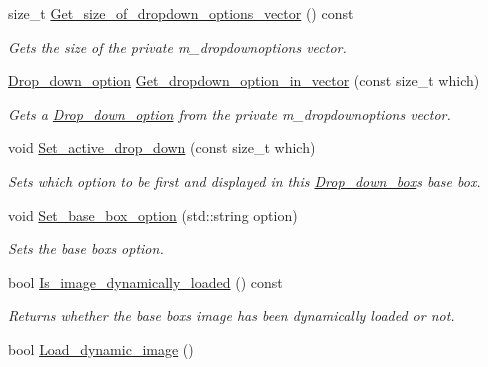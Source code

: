 \begin{DoxyCompactItemize}
size\+\_\+t \hyperlink{classjetfuel_1_1gui_1_1Drop__down__box_a72f957e19c3ce5f3da61ef3d47d09b2f}{Get\+\_\+size\+\_\+of\+\_\+dropdown\+\_\+options\+\_\+vector} () const
\begin{DoxyCompactList}\small\item\em Gets the size of the private m\+\_\+dropdownoptions vector. \end{DoxyCompactList}\item 
\hyperlink{structjetfuel_1_1gui_1_1Drop__down__box_1_1Drop__down__option}{Drop\+\_\+down\+\_\+option} \hyperlink{classjetfuel_1_1gui_1_1Drop__down__box_af6ac565eb238a27b8c988143c82cafe4}{Get\+\_\+dropdown\+\_\+option\+\_\+in\+\_\+vector} (const size\+\_\+t which)
\begin{DoxyCompactList}\small\item\em Gets a \hyperlink{structjetfuel_1_1gui_1_1Drop__down__box_1_1Drop__down__option}{Drop\+\_\+down\+\_\+option} from the private m\+\_\+dropdownoptions vector. \end{DoxyCompactList}\item 
void \hyperlink{classjetfuel_1_1gui_1_1Drop__down__box_af9d4d77418cc67a85dc98519224458f4}{Set\+\_\+active\+\_\+drop\+\_\+down} (const size\+\_\+t which)
\begin{DoxyCompactList}\small\item\em Sets which option to be first and displayed in this \hyperlink{classjetfuel_1_1gui_1_1Drop__down__box}{Drop\+\_\+down\+\_\+box}\textquotesingle{}s base box. \end{DoxyCompactList}\item 
void \hyperlink{classjetfuel_1_1gui_1_1Drop__down__box_a2fac141eb75af5c59b208753634f2e75}{Set\+\_\+base\+\_\+box\+\_\+option} (std\+::string option)
\begin{DoxyCompactList}\small\item\em Sets the base box\textquotesingle{}s option. \end{DoxyCompactList}\item 
bool \hyperlink{classjetfuel_1_1gui_1_1Drop__down__box_a66969f93183947614501055bc9e73510}{Is\+\_\+image\+\_\+dynamically\+\_\+loaded} () const
\begin{DoxyCompactList}\small\item\em Returns whether the base box\textquotesingle{}s image has been dynamically loaded or not. \end{DoxyCompactList}\item 
bool \hyperlink{classjetfuel_1_1gui_1_1Drop__down__box_a115a8142c37ed537d765302fcbf7d3fd}{Load\+\_\+dynamic\+\_\+image} ()

\end{DoxyCompactItemize}
